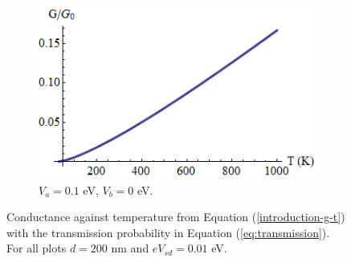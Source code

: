 \begin{figure}[h]
\begin{subfigure}[h]{0.3\textwidth}
				\centerline{\includegraphics[scale=0.35]{images/pot-t-3}}
				\caption{$V_{a}=0.1$ eV, $V_{b}=0$ eV.}
			\end{subfigure}
			\caption{Conductance against temperature from Equation (\ref{introduction-g-t}) with the transmission probability in Equation (\ref{eq:transmission}). For all plots $d=200$ nm and $eV_{sd}=0.01$ eV.}
			\label{pot-t-1}
		\end{figure}

